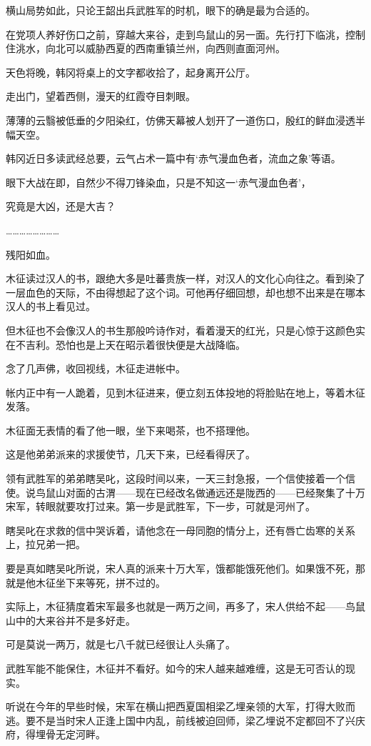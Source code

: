 横山局势如此，只论王韶出兵武胜军的时机，眼下的确是最为合适的。

在党项人养好伤口之前，穿越大来谷，走到鸟鼠山的另一面。先行打下临洮，控制住洮水，向北可以威胁西夏的西南重镇兰州，向西则直面河州。

天色将晚，韩冈将桌上的文字都收拾了，起身离开公厅。

走出门，望着西侧，漫天的红霞夺目刺眼。

薄薄的云翳被低垂的夕阳染红，仿佛天幕被人划开了一道伤口，殷红的鲜血浸透半幅天空。

韩冈近日多读武经总要，云气占术一篇中有‘赤气漫血色者，流血之象’等语。

眼下大战在即，自然少不得刀锋染血，只是不知这一‘赤气漫血色者’，

究竟是大凶，还是大吉？

……………………

残阳如血。

木征读过汉人的书，跟绝大多是吐蕃贵族一样，对汉人的文化心向往之。看到染了一层血色的天际，不由得想起了这个词。可他再仔细回想，却也想不出来是在哪本汉人的书上看见过。

但木征也不会像汉人的书生那般吟诗作对，看着漫天的红光，只是心惊于这颜色实在不吉利。恐怕也是上天在昭示着很快便是大战降临。

念了几声佛，收回视线，木征走进帐中。

帐内正中有一人跪着，见到木征进来，便立刻五体投地的将脸贴在地上，等着木征发落。

木征面无表情的看了他一眼，坐下来喝茶，也不搭理他。

这是他弟弟派来的求援使节，几天下来，已经看得厌了。

领有武胜军的弟弟瞎吴叱，这段时间以来，一天三封急报，一个信使接着一个信使。说鸟鼠山对面的古渭——现在已经改名做通远还是陇西的——已经聚集了十万宋军，转眼就要攻打过来。第一步是武胜军，下一步，可就是河州了。

瞎吴叱在求救的信中哭诉着，请他念在一母同胞的情分上，还有唇亡齿寒的关系上，拉兄弟一把。

要是真如瞎吴叱所说，宋人真的派来十万大军，饿都能饿死他们。如果饿不死，那就是他木征坐下来等死，拼不过的。

实际上，木征猜度着宋军最多也就是一两万之间，再多了，宋人供给不起——鸟鼠山中的大来谷并不是多好走。

可是莫说一两万，就是七八千就已经很让人头痛了。

武胜军能不能保住，木征并不看好。如今的宋人越来越难缠，这是无可否认的现实。

听说在今年的早些时候，宋军在横山把西夏国相梁乙埋亲领的大军，打得大败而逃。要不是当时宋人正逢上国中内乱，前线被迫回师，梁乙埋说不定都回不了兴庆府，得埋骨无定河畔。

